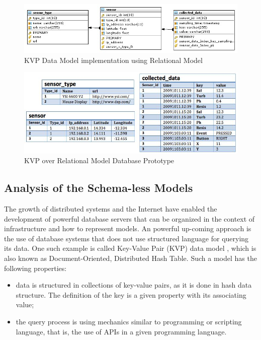 \begin{figure}[!h]
  \centering
  \includegraphics[scale=0.6]{../diagrams/KVP-on-Relational-Model}
  \caption{KVP Data Model implementation using Relational Model}
  \label{fig:KVP-on-Relational-Model}
\end{figure}

\begin{figure}[!h]
  \centering
  \includegraphics[scale=0.75]{../diagrams/persistence-example-relational-kvp}
  \caption{KVP over Relational Model Database Prototype}
  \label{fig:persistence-example-relational-kvp}
\end{figure}

\subsection{Analysis of the Schema-less Models}

The growth of distributed systems and the Internet have enabled the development
of powerful database servers that can be organized in the context of
infrastructure and how to represent models. An powerful up-coming approach is
the use of database systems that does not use structured language for querying
its data. One such example is called Key-Value Pair (KVP) data model
\cite{db-kvp}, which is also known as Document-Oriented, Distributed Hash
Table. Such a model has the following properties:

\begin{itemize}
  \item data is structured in collections of key-value pairs, as it is done in
  hash data structure. The definition of the key is a given property with its
  associating value;
  \item the query process is using mechanics similar to programming or
  scripting language, that is, the use of APIs in a given programming language.
\end{itemize}

